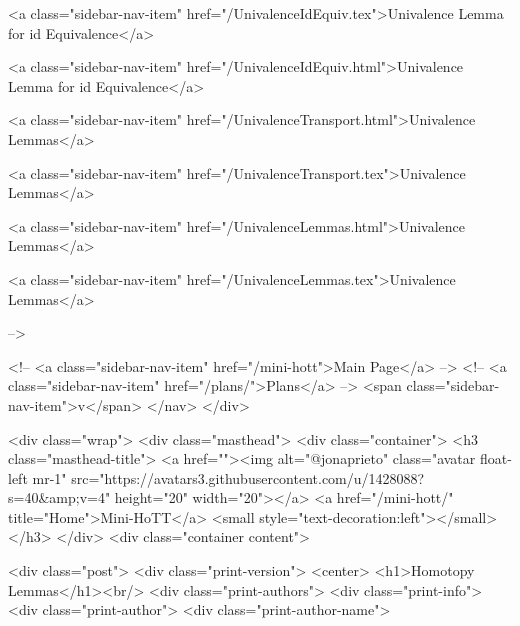       
    
      
        
          <a class="sidebar-nav-item" href="/UnivalenceIdEquiv.tex">Univalence Lemma for id Equivalence</a>
        
      
    
      
        
          <a class="sidebar-nav-item" href="/UnivalenceIdEquiv.html">Univalence Lemma for id Equivalence</a>
        
      
    
      
        
          <a class="sidebar-nav-item" href="/UnivalenceTransport.html">Univalence Lemmas</a>
        
      
    
      
        
          <a class="sidebar-nav-item" href="/UnivalenceTransport.tex">Univalence Lemmas</a>
        
      
    
      
        
          <a class="sidebar-nav-item" href="/UnivalenceLemmas.html">Univalence Lemmas</a>
        
      
    
      
        
          <a class="sidebar-nav-item" href="/UnivalenceLemmas.tex">Univalence Lemmas</a>
        
      
     -->

    <!-- <a class="sidebar-nav-item" href="/mini-hott">Main Page</a> -->
    <!-- <a class="sidebar-nav-item" href="/plans/">Plans</a> -->
    <span class="sidebar-nav-item">v</span>
  </nav>
</div>

    <div class="wrap">
      <div class="masthead">
        <div class="container">
          <h3 class="masthead-title">
            <a href=""><img alt="@jonaprieto" class="avatar float-left mr-1" src="https://avatars3.githubusercontent.com/u/1428088?s=40&amp;v=4" height="20" width="20"></a>
            <a href="/mini-hott/" title="Home">Mini-HoTT</a>
            <small style="text-decoration:left"></small>
          </h3>
        </div>
      <div class="container content">
        







<div class="post">
  <div class="print-version">
    <center>
      <h1>Homotopy Lemmas</h1><br/>
        <div class="print-authors">
          <div class="print-info">
            <div class="print-author">
              <div class="print-author-name">
                
